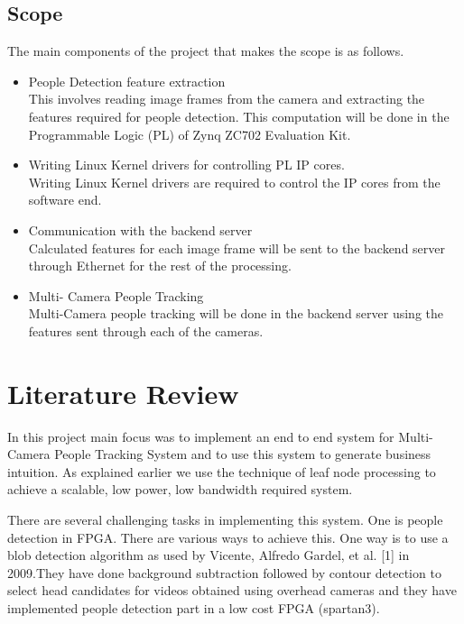 \documentclass[12pt,a4paper]{report}
\begin{document}
\section{Scope}
The main components of the project that makes the scope is as follows.
\begin{itemize}
\item People Detection feature extraction\\
This involves reading image frames from the camera and extracting the features
required for people detection. This computation will be done in the Programmable
Logic (PL) of Zynq ZC702 Evaluation Kit.
\item Writing Linux Kernel drivers for controlling PL IP cores.\\
Writing Linux Kernel drivers are required to control the IP cores from the software end.
\item Communication with the backend server \\
Calculated features for each image frame will be sent to the backend server through Ethernet for the rest of the processing.
\item Multi- Camera People Tracking \\
Multi-Camera people tracking will be done in the backend server using the features sent through each of the cameras.


\end{itemize}

\chapter{Literature Review}
In this project main focus was to implement an end to end system for Multi-Camera People Tracking System and to use this system to generate business intuition. As explained earlier we use the technique of leaf node processing to achieve a scalable, low power, low bandwidth required system.\vspace{0.3cm} 

There are several challenging tasks in implementing this system. One is people detection in FPGA. There are various ways to achieve this. One way is to use a blob detection algorithm as used by Vicente, Alfredo Gardel, et al. [1] in 2009.They have done background subtraction followed by contour detection to select head candidates for videos obtained using overhead cameras and they have implemented people detection part in a low cost FPGA (spartan3).\vspace{0.3cm}
\end{document}
